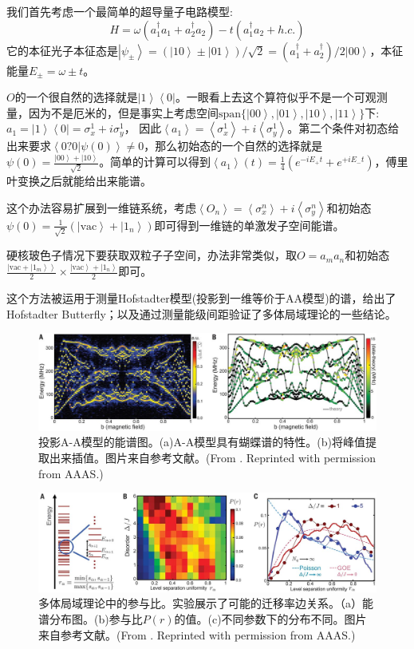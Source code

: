 \documentclass[supercite]{HustGraduPaper}
\newcommand{\bra}[1]{\left\langle #1 \right|}
\newcommand{\ket}[1]{\left| #1 \right\rangle}
\newcommand{\bracket}[2]{\left\langle #1|#2 \right\rangle}
\newcommand{\avg}[1]{\left\langle #1 \right\rangle}
\begin{document}
我们首先考虑一个最简单的超导量子电路模型:
\begin{equation}
 H = \omega(a_1^\dagger a_1 + a_2^\dagger a_2) -t(a_1^\dagger a_2 + h.c.)
\end{equation}
它的本征光子本征态是$\ket{\psi_{\pm}} = (\ket{10} \pm \ket{01})/\sqrt{2} = (a_1^\dagger + a_2^\dagger)/2 \ket{00}$，本征能量$E_{\pm} = \omega \pm t$。

$O$的一个很自然的选择就是$\ket{1}\bra{0}$。一眼看上去这个算符似乎不是一个可观测量，因为不是厄米的，但是事实上考虑空间$\text{span}\{\ket{00},\ket{01},\ket{10},\ket{11} \}$下:
$a _1= \ket{1} \bra{0} = \sigma_x ^1+ i \sigma_y^1$， 因此$\avg{a_1} = \avg{\sigma_x^1} + i \avg{\sigma_y^1}$。第二个条件对初态给出来要求$\bracket{0?0}{\psi(0)} \ne 0$，那么初始态的一个自然的选择就是
$\psi(0) = \frac{\ket{00} + \ket{10}}{\sqrt{2}}$。简单的计算可以得到$\avg{a_1}(t) = \frac{1}{4} (e^{-iE_+ t} +e^{+i E_- t})$，傅里叶变换之后就能给出来能谱。

这个办法容易扩展到一维链系统，考虑$\avg{O_n} = \avg{\sigma_x^n} + i\avg{\sigma_y^n}$和初始态$\psi(0) = \frac{1}{\sqrt{2}} (\ket{\text{vac}} + \ket{1_n})$即可得到一维链的单激发子空间能谱。

硬核玻色子情况下要获取双粒子子空间，办法非常类似，取$O = a_m a_n$和初始态$\frac{\ket{\text{vac} + \ket{1_m}}}{2} \times \frac{\ket{\text{vac}} + \ket{1_n}}{2}$即可。

这个方法被运用于测量Hofstadter模型(投影到一维等价于AA模型\cite{harper1955general,aubry1980analyticity})的谱，给出了Hofstadter Butterfly；以及通过测量能级间距验证了多体局域理论的一些结论。
\begin{figure}
	\centering
	\includegraphics[width=1\linewidth]{Figures/spectroscopy/F2.large.jpg}
	\caption{投影A-A模型的能谱图。(a)A-A模型具有蝴蝶谱的特性。(b)将峰值提取出来插值。图片来自参考文献\cite{Roushan2017}。(From \cite{Roushan2017}. Reprinted with permission from AAAS.)}
	\label{fig:f2}
\end{figure}
\begin{figure}
	\centering
	\includegraphics[width=1\linewidth]{Figures/spectroscopy/F3.large.jpg}
	\caption{多体局域理论中的参与比。实验展示了可能的迁移率边关系。（a）能谱分布图。(b)参与比$P(r)$的值。(c)不同参数下的分布不同。图片来自参考文献\cite{Roushan2017}。(From \cite{Roushan2017}. Reprinted with permission from AAAS.)}
	\label{fig:f3}
\end{figure}
\end{document}
